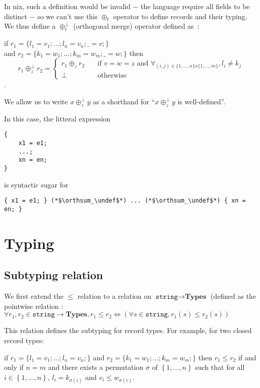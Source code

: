 \documentclass{article}
\newcommand{\ty}[1]{\texttt{#1}}
\newcommand{\undef}{\oslash}
\newcommand{\orthsum}{\oplus^\bot}
\newcommand{\subtype}{\leq}
\newcommand{\Γ}{\Gamma}
\newcommand{\τ}{\tau}
\newcommand{\σ}{\sigma}
\begin{document}
In nix, such a definition would be invalid − the language require all
fields to be distinct − so we can't use this $\oplus_t$ operator to
define records and their typing.
We thus define a $\orthsum_t$ (orthogonal merge) operator defined as~:

if $r_1 = \{ l_1 = v_1; \ldots{}; l_n = v_n; \_ = v; \}$ \\
and $r_2 = \{ k_1 = w_1; \ldots{}; k_m = w_m; \_ = w; \}$
then
\[
  r_1 \orthsum_z r_2 =
  \begin{cases}
    r_1 \oplus_z r_2
      & \quad \text{if } v = w = z \text{\ and }
      \forall_{(i,j) \in \{1, \ldots{}, n \} x \{1, \ldots{}, m \}},
        l_i \neq k_j \\
    \bot & \quad \text{otherwise}
  \end{cases}
\].

We allow us to write $x \orthsum_z y$ as a shorthand for ``$x \orthsum_z y$ is
well-defined''.

In this case, the litteral expression

\begin{lstlisting}
{
    x1 = e1;
    ...;
    xn = en;
}
\end{lstlisting}

is syntactic sugar for

\begin{lstlisting}
{ x1 = e1; } (*$\orthsum_\undef$*) ... (*$\orthsum_\undef$*) { xn = en; }
\end{lstlisting}

\section{Typing}
\subsection{Subtyping relation}

We first extend the $\subtype$ relation to a relation on $\ty{string}
\rightarrow \textbf{Types}$ (defined as the pointwise relation : $\forall r_1,
r_2 \in \ty{string} \rightarrow \textbf{Types}, r_1 \subtype r_2
\Leftrightarrow \left( \forall s \in \ty{string}, r_1(s) \subtype r_2(s)
\right)$

This relation defines the subtyping for record types. For example, for two
closed record types:

if $r_1 = \{ l_1 = v_1; \ldots{}; l_n = v_n; \}$
and $r_2 = \{ k_1 = w_1; \ldots{}; k_m = w_m; \}$
then
$r_1 \subtype r_2$ if and only if $n = m$ and there exists a permutation $\σ$
of $\left\{1, \ldots{}, n\right\}$ such that for all $i \in \left\{1, \ldots{},
n\right\}$, $l_i = k_{\σ(i)}$ and $v_i \subtype w_{\σ(i)}$.
\end{document}
